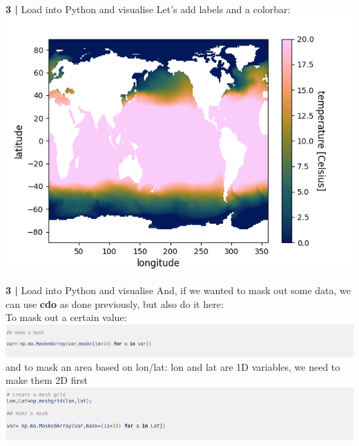  
\begin{frame}{\textbf{3 |} Load into Python and visualise} 
    Let's add labels and a colorbar:\\
        \vspace{0.5cm}
    \includegraphics[scale=0.35]{images/Script1_fig4.png}
\end{frame}
 
 
\begin{frame}{\textbf{3 |} Load into Python and visualise} 
    And, if we wanted to mask out some data, we can use \textbf{cdo} as done previously, but also do it here:\\
        \vspace{0.3cm}
    To mask out a certain value:\\
        \vspace{0.5cm}
    \includegraphics[scale=0.35]{images/Script1_step7.png}
        \vspace{0.5cm}
    and to mask an area based on lon/lat:
        \vspace{0.3cm}
    lon and lat are 1D variables, we need to make them 2D first
    \includegraphics[scale=0.35]{images/Script1_step8.png}  
        \vspace{0.3cm}
\end{frame}
 
